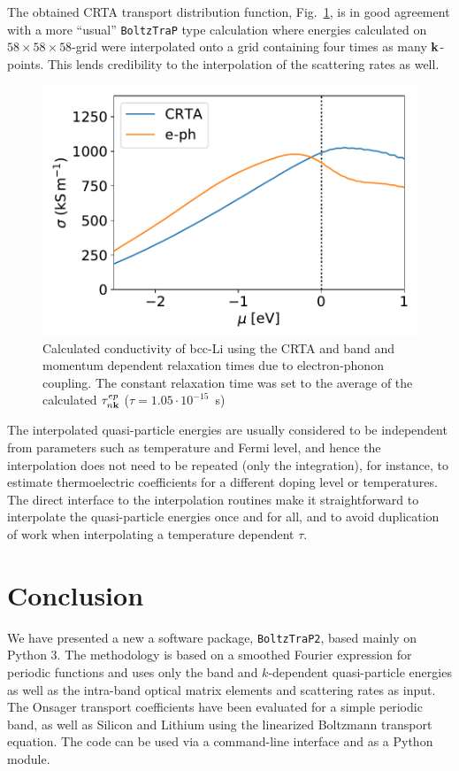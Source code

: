 \documentclass[final,5p,times,twocolumn,sort&compress]{elsarticle}
\begin{document}
The obtained CRTA transport distribution function, Fig.~\ref{fig:Li}, is in good agreement with a more ``usual'' \texttt{BoltzTraP} type calculation where energies calculated on $58\times 58\times58$-grid were interpolated onto a grid containing four times as many ${\bf k}$-points. This lends credibility to the interpolation of the scattering rates as well. 

\begin{figure}
\begin{center}
\includegraphics[width=.9\columnwidth]{Li_sigma}
\end{center}
\caption{Calculated conductivity of bcc-Li using the CRTA and band and momentum dependent relaxation times due to electron-phonon coupling. The constant relaxation time was set to the average of the calculated $\tau^{ep}_{n{\bf k}}$ ($\tau = 1.05\cdot 10^{-15}$~s)}
\label{fig:Li}
\end{figure}


The interpolated quasi-particle energies are usually considered to be independent from parameters such as temperature and Fermi level, and hence the interpolation does not need to be repeated (only the integration), for instance, to estimate thermoelectric coefficients for a different doping level or temperatures. The direct interface to the interpolation routines make it straightforward to interpolate the quasi-particle energies once and for all, and to avoid duplication of work when interpolating a temperature dependent $\tau$.


\section{Conclusion}
We have presented a new a software package, \texttt{BoltzTraP2}, based mainly on Python 3. The methodology is based on a smoothed Fourier expression for periodic functions and uses only the band and $k$-dependent quasi-particle energies as well as the intra-band optical matrix elements and scattering rates as input. The Onsager transport coefficients have been evaluated for a simple periodic band, as well as Silicon and Lithium using the linearized Boltzmann transport equation. The code can be used via a command-line interface and as a Python module.
\end{document}
